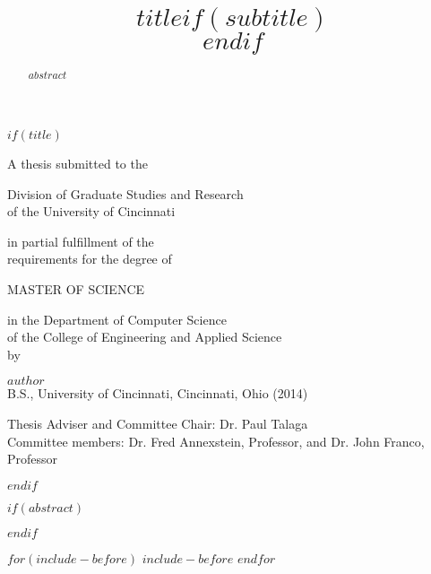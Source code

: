 \documentclass[$if(fontsize)$$fontsize$,$endif$$if(lang)$$lang$,$endif$$if(papersize)$$papersize$,$endif$$for(classoption)$$classoption$$sep$,$endfor$]{$documentclass$}
\title{$title$$if(subtitle)$\\\vspace{0.5em}{\large $subtitle$}$endif$}
\begin{document}
  $if(title)$
    \maketitle

    \setcounter{page}{1}
    \thispagestyle{empty}

    \singlespacing

    \begin{center}
      A thesis submitted to the \\

      \hfill

      Division of Graduate Studies and Research \\
      of the University of Cincinnati \\

      \hfill

      in partial fulfillment of the \\
      requirements for the degree of \\

      \hfill

      MASTER OF SCIENCE \\

      \hfill

      in the Department of Computer Science \\
      of the College of Engineering and Applied Science \\
      by \\

      \hfill

      $author$ \\

      B.S., University of Cincinnati, Cincinnati, Ohio (2014) \\

      \hfill

      Thesis Adviser and Committee Chair: Dr. Paul Talaga \\

      Committee members:  Dr. Fred Annexstein, Professor, and Dr. John Franco, Professor
    \end{center}

    \doublespacing
  $endif$

  $if(abstract)$
    \newpage
    \begin{abstract}
      $abstract$
    \end{abstract}
    \newpage\mbox{}\newpage
  $endif$

  $for(include-before)$
    $include-before$
  $endfor$
\end{document}
